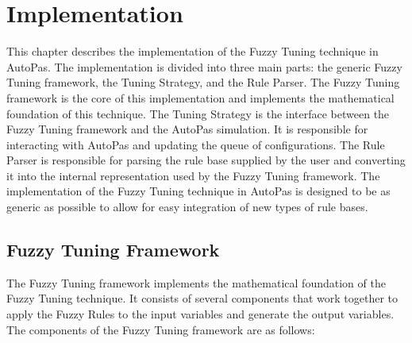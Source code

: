 \chapter{Implementation}
\label{sec:implementation}

This chapter describes the implementation of the Fuzzy Tuning technique in AutoPas. The implementation is divided into three main parts: the generic Fuzzy Tuning framework, the Tuning Strategy, and the Rule Parser. The Fuzzy Tuning framework is the core of this implementation and implements the mathematical foundation of this technique. The Tuning Strategy is the interface between the Fuzzy Tuning framework and the AutoPas simulation. It is responsible for interacting with AutoPas and updating the queue of configurations. The Rule Parser is responsible for parsing the rule base supplied by the user and converting it into the internal representation used by the Fuzzy Tuning framework.
The implementation of the Fuzzy Tuning technique in AutoPas is designed to be as generic as possible to allow for easy integration of new types of rule bases.

\section{Fuzzy Tuning Framework}

The Fuzzy Tuning framework implements the mathematical foundation of the Fuzzy Tuning technique. It consists of several components that work together to apply the Fuzzy Rules to the input variables and generate the output variables. The components of the Fuzzy Tuning framework are as follows:

